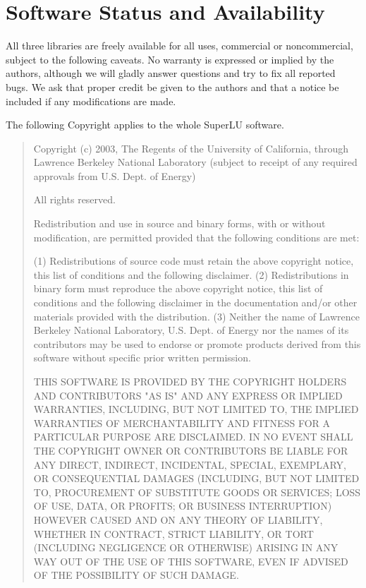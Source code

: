 \section{Software Status and Availability}
\label{sec:SoftwareStatus}

All three libraries are freely available for all uses, commercial
or noncommercial, subject to the following caveats.
No warranty is expressed or implied by the authors, although we will
gladly answer questions and try to fix all reported bugs.
We ask that proper credit be given to the authors and that a notice
be included if any modifications are made.

The following Copyright applies to the whole SuperLU software.
\begin{quote}
Copyright (c) 2003, The Regents of the University of California, through
Lawrence Berkeley National Laboratory (subject to receipt of any required 
approvals from U.S. Dept. of Energy) 

All rights reserved. 

Redistribution and use in source and binary forms, with or without
modification, are permitted provided that the following conditions are met: 

(1) Redistributions of source code must retain the above copyright notice,
this list of conditions and the following disclaimer.
(2) Redistributions in binary form must reproduce the above copyright notice,
this list of conditions and the following disclaimer in the documentation
and/or other materials provided with the distribution. 
(3) Neither the name of Lawrence Berkeley National Laboratory, U.S. Dept. of
Energy nor the names of its contributors may be used to endorse or promote
products derived from this software without specific prior written permission.

THIS SOFTWARE IS PROVIDED BY THE COPYRIGHT HOLDERS AND CONTRIBUTORS "AS
IS" AND ANY EXPRESS OR IMPLIED WARRANTIES, INCLUDING, BUT NOT LIMITED TO,
THE IMPLIED WARRANTIES OF MERCHANTABILITY AND FITNESS FOR A PARTICULAR
PURPOSE ARE DISCLAIMED. IN NO EVENT SHALL THE COPYRIGHT OWNER OR
CONTRIBUTORS BE LIABLE FOR ANY DIRECT, INDIRECT, INCIDENTAL, SPECIAL,
EXEMPLARY, OR CONSEQUENTIAL DAMAGES (INCLUDING, BUT NOT LIMITED TO,
PROCUREMENT OF SUBSTITUTE GOODS OR SERVICES; LOSS OF USE, DATA, OR
PROFITS; OR BUSINESS INTERRUPTION) HOWEVER CAUSED AND ON ANY THEORY OF
LIABILITY, WHETHER IN CONTRACT, STRICT LIABILITY, OR TORT (INCLUDING
NEGLIGENCE OR OTHERWISE) ARISING IN ANY WAY OUT OF THE USE OF THIS
SOFTWARE, EVEN IF ADVISED OF THE POSSIBILITY OF SUCH DAMAGE. 
\end{quote}

